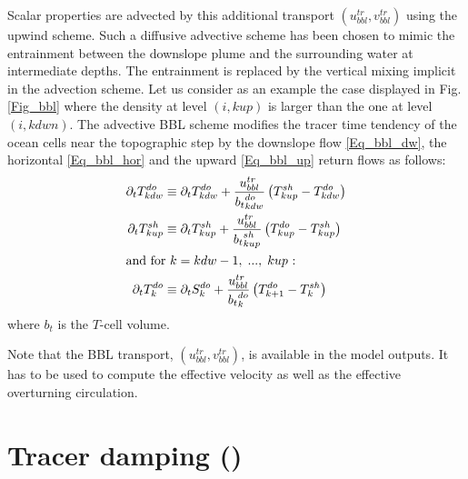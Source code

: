 Scalar properties are advected by this additional transport $( u^{tr}_{bbl}, v^{tr}_{bbl} )$ 
using the upwind scheme. Such a diffusive advective scheme has been chosen 
to mimic the entrainment between the downslope plume and the surrounding 
water at intermediate depths. The entrainment is replaced by the vertical mixing 
implicit in the advection scheme. Let us consider as an example the 
case displayed in Fig.\ref{Fig_bbl} where the density at level $(i,kup)$ is 
larger than the one at level $(i,kdwn)$. The advective BBL scheme
modifies the tracer time tendency of the ocean cells near the 
topographic step by the downslope flow \eqref{Eq_bbl_dw}, 
the horizontal \eqref{Eq_bbl_hor}  and the upward \eqref{Eq_bbl_up} 
return flows as follows: 
\begin{align} 
\partial_t T^{do}_{kdw} &\equiv \partial_t T^{do}_{kdw}
                                     +  \frac{u^{tr}_{bbl}}{{b_t}^{do}_{kdw}}  \left( T^{sh}_{kup} - T^{do}_{kdw} \right)  \label{Eq_bbl_dw} \\
%
\partial_t T^{sh}_{kup} &\equiv \partial_t T^{sh}_{kup} 
				   + \frac{u^{tr}_{bbl}}{{b_t}^{sh}_{kup}}   \left( T^{do}_{kup} - T^{sh}_{kup} \right)   \label{Eq_bbl_hor} \\
%
\intertext{and for $k =kdw-1,\;..., \; kup$ :} 
%
\partial_t T^{do}_{k} &\equiv \partial_t S^{do}_{k}
				   + \frac{u^{tr}_{bbl}}{{b_t}^{do}_{k}}   \left( T^{do}_{k+1} - T^{sh}_{k} \right)   \label{Eq_bbl_up}
\end{align}
where $b_t$ is the $T$-cell volume. 

Note that the BBL transport, $( u^{tr}_{bbl}, v^{tr}_{bbl} )$, is available in 
the model outputs. It has to be used to compute the effective velocity 
as well as the effective overturning circulation.

\section  [Tracer damping (\textit{tradmp})]
		{Tracer damping ()}
\label{TRA_dmp}

